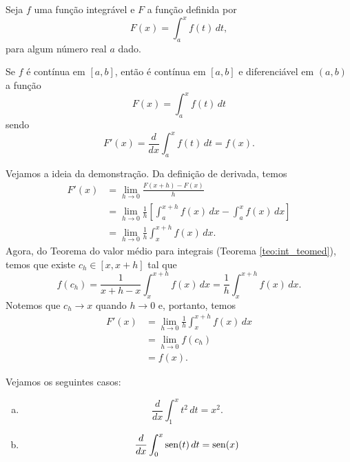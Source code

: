 Seja $f$ uma função integrável e $F$ a função definida por
\begin{equation}
  F(x) = \int_a^x f(t)\,dt,
\end{equation}
para algum número real $a$ dado.

\begin{teo}\label{teo:int_tfc1}
  Se $f$ é contínua em $[a, b]$, então é contínua em $[a, b]$ e diferenciável em $(a, b)$ a função
  \begin{equation}
    F(x) = \int_a^x f(t)\,dt
  \end{equation}
  sendo
  \begin{equation}
    F'(x) = \frac{d}{dx}\int_a^x f(t)\,dt = f(x).
  \end{equation}
\end{teo}
\begin{dem}
  Vejamos a ideia da demonstração. Da definição de derivada, temos
  \begin{align}
    F'(x) &= \lim_{h\to 0} \frac{F(x+h) - F(x)}{h} \\
          &= \lim_{h\to 0} \frac{1}{h}\left[\int_a^{x+h} f(x)\,dx - \int_a^x f(x)\, dx\right] \\
          &= \lim_{h\to 0} \frac{1}{h}\int_x^{x+h} f(x)\,dx.
  \end{align}
  Agora, do Teorema do valor médio para integrais (Teorema \ref{teo:int_teomed}), temos que existe $c_h \in [x, x+h]$ tal que
  \begin{equation}
    f(c_h) = \frac{1}{x+h-x}\int_x^{x+h} f(x)\,dx = \frac{1}{h}\int_x^{x+h} f(x)\,dx.
  \end{equation}
  Notemos que $c_h\to x$ quando $h\to 0$ e, portanto, temos
  \begin{align}
    F'(x) &= \lim_{h\to 0} \frac{1}{h}\int_x^{x+h} f(x)\,dx \\
          &= \lim_{h\to 0} f(c_h) \\
          &= f(x).
  \end{align}
\end{dem}

\begin{ex}
  Vejamos os seguintes casos:
  \begin{enumerate}[a)]
  \item
    \begin{equation}
      \frac{d}{dx}\int_1^x t^2\,dt = x^2.
    \end{equation}
  \item
    \begin{equation}
      \frac{d}{dx}\int_0^x \operatorname{sen}(t)\,dt = \operatorname{sen}(x)
    \end{equation}
  \end{enumerate}
\end{ex}

